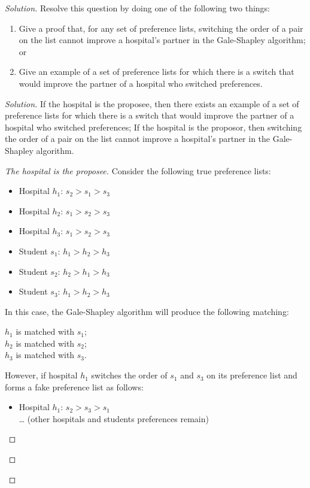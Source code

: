 \documentclass[12pt]{article}
\begin{document}
\begin{enumerate}[leftmargin=*]
\begin{proof}[Solution]
Resolve this question by doing one of the following two things:
\begin{enumerate}[label=(\alph*)]
\item Give a proof that, for any set of preference lists, switching the order of a pair on the list cannot improve a hospital's partner in the Gale-Shapley algorithm; or
\item Give an example of a set of preference lists for which there is a switch that would improve the partner of a hospital who switched preferences.
\end{enumerate}

\begin{proof}[Solution]
    If the hospital is the proposee, then there exists an example of a set of preference lists for which there is a switch that would improve the partner of a hospital who switched preferences;
    If the hospital is the proposor, then switching the order of a pair on the list cannot improve a hospital's partner in the Gale-Shapley algorithm.
    
    \begin{proof}[The hospital is the proposee]
    Consider the following true preference lists:
    \begin{itemize}
        \item Hospital $h_1$: $s_2 > s_1 > s_3$
        \item Hospital $h_2$: $s_1 > s_2 > s_3$
        \item Hospital $h_3$: $s_1 > s_2 > s_3$
        \item Student $s_1$: $h_1 > h_2 > h_3$
        \item Student $s_2$: $h_2 > h_1 > h_3$
        \item Student $s_3$: $h_1 > h_2 > h_3$
    \end{itemize}

    In this case, the Gale-Shapley algorithm will produce the following matching:
    \begin{center}
        $h_1$ is matched with $s_1$;\\
        $h_2$ is matched with $s_2$;\\
        $h_3$ is matched with $s_3$.
    \end{center}

    However, if hospital $h_1$ switches the order of $s_1$ and $s_3$ on its preference list and forms a fake preference list as follows:
    \begin{itemize}
        \item Hospital $h_1$: $s_2 > s_3 > s_1$ \\
        \dots
            (other hospitals and students preferences remain)
    \end{itemize}


\end{proof}
\end{proof}
\end{proof}
\end{enumerate}
\end{document}
